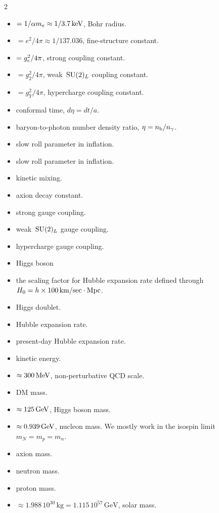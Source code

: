 \begin{multicols}{2}
\begin{itemize}
\item[$a_0$] $=1/\alpha m_e\approx 1/3.7\,{\rm keV}$, Bohr radius.
\item[$\alpha$] $=e^2/4\pi\approx 1/137.036$, fine-structure constant.
\item[$\alpha_{\rm s}$] $=g_{\rm s}^2/4\pi$, strong coupling constant.
\item[$\alpha_2$] $=g_2^2/4\pi$, weak $\,{\rm SU}(2)_L$ coupling constant.
\item[$\alpha_Y$] $=g_Y^2/4\pi$, hypercharge coupling constant.
\item[$d\eta:$] conformal time, $d\eta=dt/a$.
\item[$\eta$:]  baryon-to-photon number density ratio, $\eta =  n_{\rm b}/n_\gamma$.
\item[$\eta$:]  slow roll parameter in inflation.
\item[$\epsilon$:]  slow roll parameter in inflation.
\item[$\epsilon$:]  kinetic mixing.
\item[$f_{a}$:] axion decay constant.
\item[$g_{\rm s}$:] strong gauge coupling.
\item[$g_2$:] weak $\,{\rm SU}(2)_L$ gauge coupling.
\item[$g_Y$:] hypercharge gauge coupling.
\item[$h$:] Higgs boson 
\item[$h$:]  the scaling factor for Hubble expansion rate defined through $H_0 = h\times 100\,{\rm km}/{\rm sec\cdot Mpc}$.
\item[$H$:] Higgs doublet. 
\item[$H$:] Hubble expansion rate.
\item[$H_0$:] present-day Hubble expansion rate.
\item[$K$:] kinetic energy.
\item[$\Lambda_{\rm QCD}$] $\approx 300\,{\rm MeV}$, non-perturbative QCD scale.
\item[$M$:] DM mass.
\item[$M_h$] $\approx 125\,{\rm GeV}$, Higgs boson mass.
\item[$m_N$] $ \approx 0.939\,{\rm GeV}$, nucleon mass. We mostly work in the isospin limit $m_N=m_p=m_n$.
\item[$m_a$:] axion mass.
\item[$m_n$:] neutron mass.
\item[$m_p$:] proton mass.
\item[$M_{\odot}$]$\approx 1.988\,10^{30}\,\text{kg}=1.115\,10^{57}\,\text{GeV}$, solar mass.

\end{itemize}
\end{multicols}
